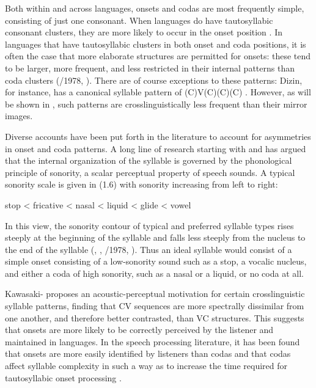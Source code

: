   Both within and across languages, onsets and codas are most frequently simple, consisting of just one consonant. When languages do have tautosyllabic consonant clusters, they are more likely to occur in the onset position \citep{Blevins2006}. In languages that have tautosyllabic clusters in both onset and coda positions, it is often the case that more elaborate structures are permitted for onsets: these tend to be larger, more frequent, and less restricted in their internal patterns than coda clusters (\citealt{Greenberg1965}/1978, \citealt{Blevins2006}). There are of course exceptions to these patterns: Dizin, for instance, has a canonical syllable pattern of (C)V(C)(C)(C) \citep{Beachy2005}. However, as will be shown in , such patterns are crosslinguistically less frequent than their mirror images.



  Diverse accounts have been put forth in the literature to account for asymmetries in onset and coda patterns. A long line of research starting with \citet{Sievers1881} and \citet{Jespersen1904} has argued that the internal organization of the syllable is governed by the phonological principle of sonority, a scalar perceptual property of speech sounds. A typical sonority scale is given in (1.6) with sonority increasing from left to right:



\ea\label{ex:(1.6)}
  stop < fricative < nasal < liquid < glide < vowel
\z



In this view, the sonority contour of typical and preferred syllable types rises steeply at the beginning of the syllable and falls less steeply from the nucleus to the end of the syllable (\citealt{Zwicky1972}, \citealt{Hooper1976}, \citealt{Greenberg1965}/1978, \citealt{Clements1990}). Thus an ideal syllable would consist of a simple onset consisting of a low-sonority sound such as a stop, a vocalic nucleus, and either a coda of high sonority, such as a nasal or a liquid, or no coda at all.



  Kawasaki-\citet{Fukumori1992} proposes an acoustic-perceptual motivation for certain crosslinguistic syllable patterns, finding that CV sequences are more spectrally dissimilar from one another, and therefore better contrasted, than VC structures. This suggests that onsets are more likely to be correctly perceived by the listener and maintained in languages. In the speech processing literature, it has been found that onsets are more easily identified by listeners than codas \citep{ContentEtAl2001} and that codas affect syllable complexity in such a way as to increase the time required for tautosyllabic onset processing \citep{SeguiEtAl1991}. 



